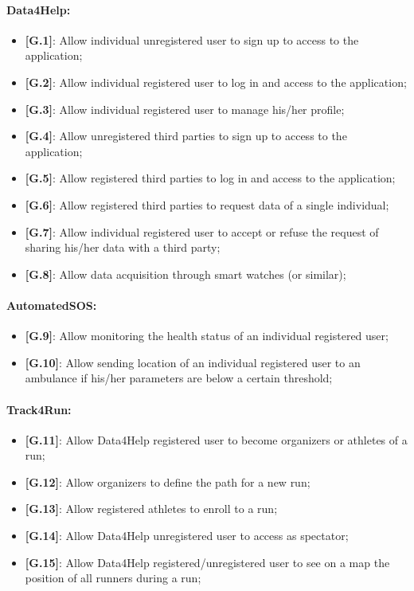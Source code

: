 \paragraph{Data4Help:}
\begin{itemize}
  \item \textbf{[G.1]}: Allow individual unregistered user to sign up to access to the application;
  \item \textbf{[G.2]}: Allow individual registered user to log in and access to the application;
  \item \textbf{[G.3]}: Allow individual registered user to manage his/her profile;
  \item \textbf{[G.4]}: Allow unregistered third parties to sign up to access to the application;
  \item \textbf{[G.5]}: Allow registered third parties to log in and access to the application;
  \item \textbf{[G.6]}: Allow registered third parties to request data of a single individual;
  \item \textbf{[G.7]}: Allow individual registered user to accept or refuse the request of sharing his/her data with a third party;
  \item \textbf{[G.8]}: Allow data acquisition through smart watches (or similar);
\end{itemize}

\paragraph{AutomatedSOS:}
\begin{itemize}
  \item \textbf{[G.9]}: Allow monitoring the health status of an individual registered user;
  \item \textbf{[G.10]}: Allow sending location of an individual registered user to an ambulance if his/her parameters are below a certain threshold;
\end{itemize}

\paragraph{Track4Run:}
\begin{itemize}
  \item \textbf{[G.11]}: Allow Data4Help registered user to become organizers or athletes of a run;
  \item \textbf{[G.12]}: Allow organizers to define the path for a new run;
  \item \textbf{[G.13]}: Allow registered athletes to enroll to a run;
  \item \textbf{[G.14]}: Allow Data4Help unregistered user to access as spectator;
  \item \textbf{[G.15]}: Allow Data4Help registered/unregistered user to see on a map the position of all runners during a run;
\end{itemize}

